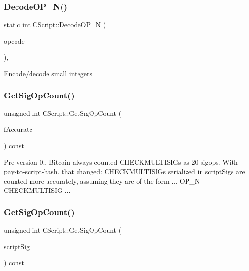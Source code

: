 \subsubsection{\texorpdfstring{Decode\+O\+P\+\_\+\+N()}{DecodeOP\_N()}}
{\footnotesize\ttfamily static int C\+Script\+::\+Decode\+O\+P\+\_\+N (\begin{DoxyParamCaption}\item[{opcodetype}]{opcode }\end{DoxyParamCaption})\hspace{0.3cm}{\ttfamily [inline]}, {\ttfamily [static]}}

Encode/decode small integers\+: \mbox{\label{class_c_script_a957f92ddf3efcd76b66e514c05f27dde}} 
\subsubsection{\texorpdfstring{Get\+Sig\+Op\+Count()}{GetSigOpCount()}\hspace{0.1cm}{\footnotesize\ttfamily [1/2]}}
{\footnotesize\ttfamily unsigned int C\+Script\+::\+Get\+Sig\+Op\+Count (\begin{DoxyParamCaption}\item[{bool}]{f\+Accurate }\end{DoxyParamCaption}) const}

Pre-\/version-\/0., Bitcoin always counted C\+H\+E\+C\+K\+M\+U\+L\+T\+I\+S\+I\+Gs as 20 sigops. With pay-\/to-\/script-\/hash, that changed\+: C\+H\+E\+C\+K\+M\+U\+L\+T\+I\+S\+I\+Gs serialized in script\+Sigs are counted more accurately, assuming they are of the form ... O\+P\+\_\+N C\+H\+E\+C\+K\+M\+U\+L\+T\+I\+S\+IG ... \mbox{\label{class_c_script_ab2fc38465955bb6688d204036633ee85}} 
\subsubsection{\texorpdfstring{Get\+Sig\+Op\+Count()}{GetSigOpCount()}\hspace{0.1cm}{\footnotesize\ttfamily [2/2]}}
{\footnotesize\ttfamily unsigned int C\+Script\+::\+Get\+Sig\+Op\+Count (\begin{DoxyParamCaption}\item[{const \mbox{\hyperlink{class_c_script}{C\+Script}} \&}]{script\+Sig }\end{DoxyParamCaption}) const}

